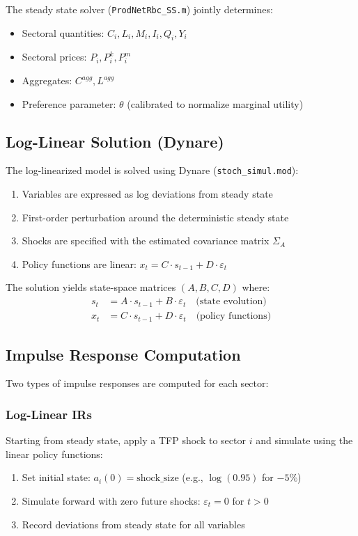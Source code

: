 \documentclass[11pt]{article}
\begin{document}
The steady state solver (\texttt{ProdNetRbc\_SS.m}) jointly determines:
\begin{itemize}
    \item Sectoral quantities: $C_i, L_i, M_i, I_i, Q_i, Y_i$
    \item Sectoral prices: $P_i, P^k_i, P^m_i$
    \item Aggregates: $C^{agg}, L^{agg}$
    \item Preference parameter: $\theta$ (calibrated to normalize marginal utility)
\end{itemize}

\subsection{Log-Linear Solution (Dynare)}

The log-linearized model is solved using Dynare (\texttt{stoch\_simul.mod}):

\begin{enumerate}
    \item Variables are expressed as log deviations from steady state
    \item First-order perturbation around the deterministic steady state
    \item Shocks are specified with the estimated covariance matrix $\Sigma_A$
    \item Policy functions are linear: $x_t = C \cdot s_{t-1} + D \cdot \varepsilon_t$
\end{enumerate}

The solution yields state-space matrices $(A, B, C, D)$ where:
\begin{align}
    s_t &= A \cdot s_{t-1} + B \cdot \varepsilon_t \quad \text{(state evolution)} \\
    x_t &= C \cdot s_{t-1} + D \cdot \varepsilon_t \quad \text{(policy functions)}
\end{align}

\subsection{Impulse Response Computation}

Two types of impulse responses are computed for each sector:

\subsubsection{Log-Linear IRs}

Starting from steady state, apply a TFP shock to sector $i$ and simulate using the linear policy functions:
\begin{enumerate}
    \item Set initial state: $a_i(0) = \text{shock\_size}$ (e.g., $\log(0.95)$ for $-5\%$)
    \item Simulate forward with zero future shocks: $\varepsilon_t = 0$ for $t > 0$
    \item Record deviations from steady state for all variables
\end{enumerate}
\end{document}
